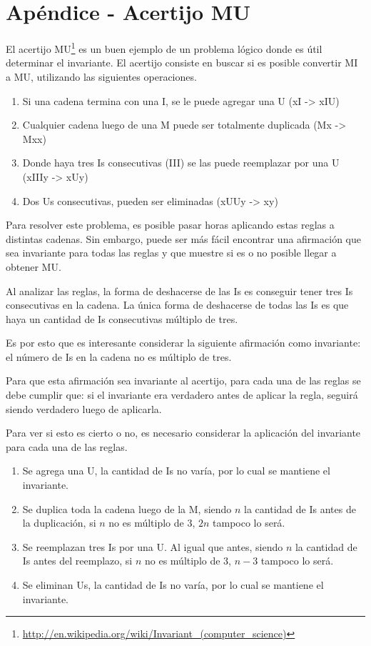 \section{Apéndice - Acertijo MU}

El acertijo MU\footnote{
\url{http://en.wikipedia.org/wiki/Invariant\_(computer\_science)}} es un buen
ejemplo de un problema lógico donde es útil determinar el invariante.  El
acertijo consiste en buscar si es posible convertir MI a MU, utilizando las
siguientes operaciones.

\begin{enumerate}
\item Si una cadena termina con una I, se le puede agregar una U (xI -> xIU)
\item Cualquier cadena luego de una M puede ser totalmente duplicada (Mx ->
Mxx)
\item Donde haya tres Is consecutivas (III) se las puede reemplazar por una U
(xIIIy -> xUy)
\item Dos Us consecutivas, pueden ser eliminadas (xUUy -> xy)
\end{enumerate}

Para resolver este problema, es posible pasar horas aplicando estas reglas
a distintas cadenas.  Sin embargo, puede ser más fácil encontrar una
afirmación que sea invariante para todas las reglas y que muestre si es o
no posible llegar a obtener MU.

Al analizar las reglas, la forma de deshacerse de las Is es conseguir tener
tres Is consecutivas en la cadena.  La única forma de deshacerse de todas las
Is es que haya un cantidad de Is consecutivas múltiplo de tres.

Es por esto que es interesante considerar la siguiente afirmación como
invariante: el número de Is en la cadena no es múltiplo de tres.

Para que esta afirmación sea invariante al acertijo, para
cada una de las reglas se debe cumplir que: si el invariante era verdadero
antes de aplicar la regla, seguirá siendo verdadero luego de aplicarla.

Para ver si esto es cierto o no, es necesario considerar la aplicación del
invariante para cada una de las reglas.

\begin{enumerate}
\item Se agrega una U, la cantidad de Is no varía, por lo cual se mantiene el
invariante.
\item Se duplica toda la cadena luego de la M, siendo $n$ la cantidad de
Is antes de la duplicación, si $n$ no es múltiplo de 3, $2n$ tampoco lo será.
\item Se reemplazan tres Is por una U.  Al igual que antes, siendo $n$ la
cantidad de Is antes del reemplazo, si $n$ no es múltiplo de 3, $n-3$ tampoco
lo será.
\item Se eliminan Us, la cantidad de Is no varía, por lo cual se mantiene el
invariante.
\end{enumerate}


